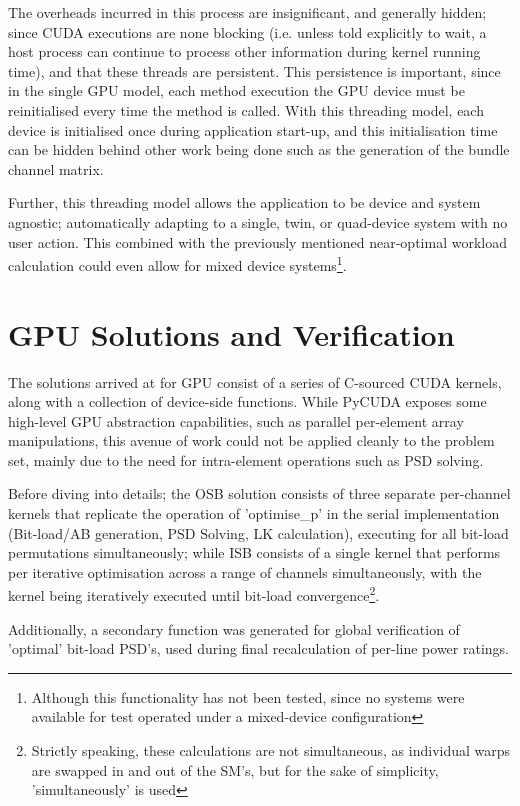 The overheads incurred in this process are insignificant, and generally hidden; since CUDA executions are none blocking (i.e. unless told explicitly to wait, a host process can continue to process other information during kernel running time), and that these threads are persistent. This persistence is important, since in the single GPU model, each method execution the GPU device must be reinitialised every time the method is called. With this threading model, each device is initialised once during application start-up, and this initialisation time can be hidden behind other work being done such as the generation of the bundle channel matrix.

Further, this threading model allows the application to be device and system agnostic; automatically adapting to a single, twin, or quad-device system with no user action. This combined with the previously mentioned near-optimal workload calculation could even allow for mixed device systems\footnote{Although this functionality has not been tested, since no systems were available for test operated under a mixed-device configuration}.

\section{GPU Solutions and Verification}
The solutions arrived at for GPU consist of a series of C-sourced CUDA kernels, along with a collection of device-side functions. While PyCUDA exposes some high-level GPU abstraction capabilities, such as parallel per-element array manipulations, this avenue of work could not be applied cleanly to the problem set, mainly due to the need for intra-element operations such as PSD solving.

Before diving into details; the OSB solution consists of three separate per-channel kernels that replicate the operation of 'optimise\_p' in the serial implementation (Bit-load/AB generation, PSD Solving, LK calculation), executing for all bit-load permutations simultaneously; while ISB consists of a single kernel that performs per iterative optimisation across a range of channels simultaneously, with the kernel being iteratively executed until bit-load convergence\footnote{Strictly speaking, these calculations are not simultaneous, as individual warps are swapped in and out of the SM's, but for the sake of simplicity, 'simultaneously' is used}.

Additionally, a secondary function was generated for global verification of 'optimal' bit-load PSD's, used during final recalculation of per-line power ratings.

